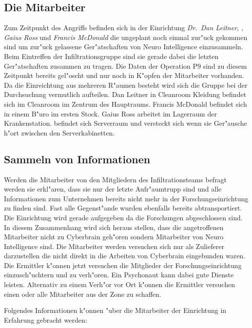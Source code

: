 \subsection{Die Mitarbeiter} 
Zum Zeitpunkt des Angriffs befinden sich in der Einrichtung \emph{Dr.~Dan Leitner}, \emph{\ml{}}, \emph{Gaius Ross} und \emph{Francis McDonald} die ungeplant noch einmal zur"uck gekommen sind um zur"uck gelassene Ger"atschaften von Neuro Intelligence einzusammeln. Beim Eintreffen der Infiltrationsgruppe sind sie gerade dabei die letzten Ger"atschaften zusammen zu tragen. Die Daten der Operation P9 sind zu diesem Zeitpunkt bereits gel"oscht und nur noch in K"opfen der Mitarbeiter vorhanden. Da die Einreichtung aus mehreren R"aumen besteht wird sich die Gruppe bei der Durchsuchung vermutlich aufteilen. Dan Leitner in Cleanroom Kleidung befindet sich im Cleanroom im Zentrum des Hauptraums. Francis McDonald befindet sich in einem B"uro im ersten Stock. Gaius Ross arbeitet im Lagerraum der Krankenstation. \ml{} befindet sich Serverraum und versteckt sich wenn sie Ger"ausche h"ort zwischen den Serverkabinetten.

\subsection{Sammeln von Informationen} 
Werden die Mitarbeiter von den Mitgliedern des Infiltrationsteams befragt werden sie erkl"aren, dass 
sie nur der letzte Aufr"aumtrupp sind und alle Informationen zum Unternehmen bereits nicht mehr in der Forschungseinrichtung zu finden sind. Fast alle Gegenst"ande wurden ebenfalls bereits abtransportiert. Die Einrichtung wird gerade aufgegeben da die Forschungen abgeschlossen sind. In diesem Zusammenhang wird sich heraus stellen, dass die angetroffenen Mitarbeiter nicht zu Cyberbrain geh"oren sondern Mitarbeiter von Neuro Intelligence sind. Die Mitarbeiter werden versuchen sich nur als Zulieferer darzustellen die nicht direkt in die Arbeiten von Cyberbrain eingebunden waren. Die Ermittler k"onnen jetzt versuchen die Mitglieder der Forschungseinrichtung einzusch"uchtern und zu verh"oren. Ein Psychonaut kann dabei gute Dienste leisten. Alternativ zu einem Verh"or vor Ort k"onnen die Ermittler versuchen einen oder alle Mitarbeiter aus der Zone zu schaffen. 

Folgendes Informationen k"onnen "uber die Mitarbeiter der Einrichtung in Erfahrung gebracht werden:


